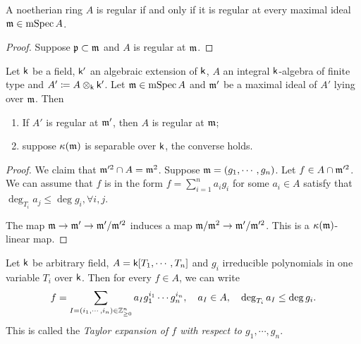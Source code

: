     \begin{proposition}\label{prop: regularity is a local property}
        A noetherian ring \(A\) is regular if and only if it is regular at every maximal ideal \({\mathfrak{m}} \in \operatorname{mSpec} A\). 
    \end{proposition}
    \begin{proof}
        Suppose \({\mathfrak{p}} \subset {\mathfrak{m}}\) and \(A\) is regular at \({\mathfrak{m}}\).
        
    \end{proof}


    \begin{proposition}\label{prop: regularity under base field extension}
        Let \({\mathsf{k}}\) be a field, \({\mathsf{k}}'\) an algebraic extension of \({\mathsf{k}}\), \(A\) an integral \({\mathsf{k}}\)-algebra of finite type and \(A' \coloneqq A \otimes_{{\mathsf{k}}} {\mathsf{k}}'\).
        Let \({\mathfrak{m}} \in \operatorname{mSpec} A\) and \({\mathfrak{m}}'\) be a maximal ideal of \(A'\) lying over \({\mathfrak{m}}\).
        Then 
        \begin{enumerate}
            \item If \(A'\) is regular at \({\mathfrak{m}}'\), then \(A\) is regular at \({\mathfrak{m}}\);
            \item suppose \({\kappa}({\mathfrak{m}})\) is separable over \({\mathsf{k}}\), the converse holds.
        \end{enumerate}
    \end{proposition}
    \begin{proof}
        We claim that ${\mathfrak{m}}'^2 \cap A = {\mathfrak{m}}^2$.
        Suppose \({\mathfrak{m}} = (g_1,\cdots,g_n)\).
        Let \(f \in A \cap {\mathfrak{m}}'^2\).
        We can assume that \(f\) is in the form \(f = \sum_{i=1}^n a_i g_i\) for some \(a_i \in A\) satisfy that \(\deg_{T_i} a_j \leq \deg g_i, \forall i,j\).

        The map ${\mathfrak{m}} \to {\mathfrak{m}}' \to {\mathfrak{m}}'/{\mathfrak{m}}'^2$ induces a map ${\mathfrak{m}}/{\mathfrak{m}}^2 \to {\mathfrak{m}}'/{\mathfrak{m}}'^2$.
        This is a \({\kappa}({\mathfrak{m}})\)-linear map.
    \end{proof}

    \begin{remark}\label{remark: Taylor expansion with respect to irreducible polynomials}
        Let \({\mathsf{k}}\) be arbitrary field, \(A = {\mathsf{k}}[T_1,\cdots,T_n]\) and \(g_i\) irreducible polynomials in one variable \(T_i\) over \({\mathsf{k}}\).
        Then for every \(f \in A\), we can write
        \[ f = \sum_{I=(i_1,\cdots,i_n) \in {\mathbb{Z}}_{\geq 0}^n} a_I g_1^{i_1}\cdots g_n^{i_n}, \quad a_I \in A, \quad \deg_{T_i} a_I \leq \deg g_i.\]
        This is called the \textit{Taylor expansion of \(f\) with respect to \(g_1,\cdots,g_n\)}. 
    \end{remark}


